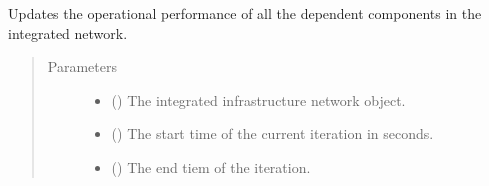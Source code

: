 \documentclass[letterpaper,10pt,english]{sphinxmanual}
\begin{document}
\begin{fulllineitems}
\begin{fulllineitems}
\begin{quote}
\begin{description}
\end{description}\end{quote}

\end{fulllineitems}


\begin{fulllineitems}
\label{\detokenize{apidoc:dreaminsg_integrated_model.src.network_sim_models.interdependencies.DependencyTable.update_dependencies}}
\sphinxAtStartPar
Updates the operational performance of all the dependent components in the integrated network.
\begin{quote}\begin{description}
\item[{Parameters}] \leavevmode\begin{itemize}
\item {} 
\sphinxAtStartPar
{} () \textendash{} The integrated infrastructure network object.

\item {} 
\sphinxAtStartPar
{} () \textendash{} The start time of the current iteration in seconds.

\item {} 
\sphinxAtStartPar
{} () \textendash{} The end tiem of the iteration.

\end{itemize}

\end{description}\end{quote}

\end{fulllineitems}


\end{fulllineitems}

\end{document}
